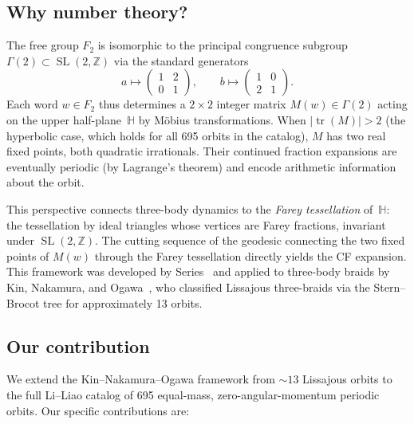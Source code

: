 \documentclass[11pt]{article}
\theoremstyle{definition}
\newcommand{\Z}{\mathbb{Z}}
\newcommand{\HH}{\mathbb{H}}
\DeclareMathOperator{\tr}{tr}
\DeclareMathOperator{\SL}{SL}
\begin{document}
\subsection{Why number theory?}

The free group $F_2$ is isomorphic to the principal congruence
subgroup $\Gamma(2) \subset \SL(2,\Z)$ via the standard generators
\begin{equation}\label{eq:generators}
a \mapsto \begin{pmatrix} 1 & 2 \\ 0 & 1 \end{pmatrix}, \qquad
b \mapsto \begin{pmatrix} 1 & 0 \\ 2 & 1 \end{pmatrix}.
\end{equation}
Each word $w \in F_2$ thus determines a $2 \times 2$ integer matrix
$M(w) \in \Gamma(2)$ acting on the upper half-plane~$\HH$ by
M\"obius transformations. When $|\tr(M)| > 2$ (the hyperbolic case,
which holds for all 695 orbits in the catalog), $M$ has two real
fixed points, both quadratic irrationals. Their continued fraction
expansions are eventually periodic (by Lagrange's theorem) and
encode arithmetic information about the orbit.

This perspective connects three-body dynamics to the \emph{Farey
tessellation} of~$\HH$: the tessellation by ideal triangles whose
vertices are Farey fractions, invariant under $\SL(2,\Z)$. The
cutting sequence of the geodesic connecting the two fixed points of
$M(w)$ through the Farey tessellation directly yields the CF
expansion. This framework was developed by
Series~\cite{Series1985} and applied to three-body braids by
Kin, Nakamura, and Ogawa~\cite{KNO2023}, who classified Lissajous
three-braids via the Stern--Brocot tree for approximately 13 orbits.

\subsection{Our contribution}

We extend the Kin--Nakamura--Ogawa framework from ${\sim}\!13$
Lissajous orbits to the full Li--Liao catalog of 695 equal-mass,
zero-angular-momentum periodic orbits. Our specific contributions
are:
\end{document}
